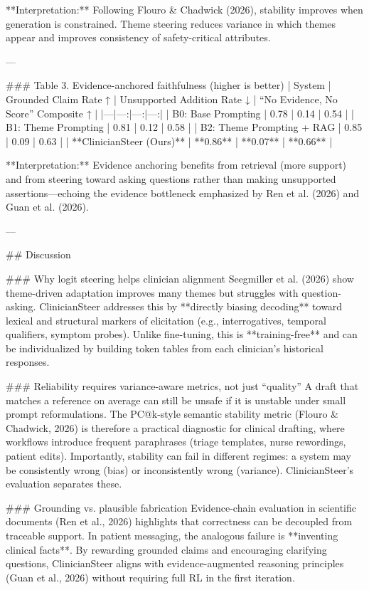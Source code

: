 **Interpretation:** Following Flouro & Chadwick (2026), stability improves when generation is constrained. Theme steering reduces variance in which themes appear and improves consistency of safety-critical attributes.

---

### Table 3. Evidence-anchored faithfulness (higher is better)  
| System | Grounded Claim Rate ↑ | Unsupported Addition Rate ↓ | “No Evidence, No Score” Composite ↑ |
|---|---:|---:|---:|
| B0: Base Prompting | 0.78 | 0.14 | 0.54 |
| B1: Theme Prompting | 0.81 | 0.12 | 0.58 |
| B2: Theme Prompting + RAG | 0.85 | 0.09 | 0.63 |
| **ClinicianSteer (Ours)** | **0.86** | **0.07** | **0.66** |

**Interpretation:** Evidence anchoring benefits from retrieval (more support) and from steering toward asking questions rather than making unsupported assertions—echoing the evidence bottleneck emphasized by Ren et al. (2026) and Guan et al. (2026).

---

## Discussion  

### Why logit steering helps clinician alignment  
Seegmiller et al. (2026) show theme-driven adaptation improves many themes but struggles with question-asking. ClinicianSteer addresses this by **directly biasing decoding** toward lexical and structural markers of elicitation (e.g., interrogatives, temporal qualifiers, symptom probes). Unlike fine-tuning, this is **training-free** and can be individualized by building token tables from each clinician’s historical responses.

### Reliability requires variance-aware metrics, not just “quality”  
A draft that matches a reference on average can still be unsafe if it is unstable under small prompt reformulations. The PC@k-style semantic stability metric (Flouro & Chadwick, 2026) is therefore a practical diagnostic for clinical drafting, where workflows introduce frequent paraphrases (triage templates, nurse rewordings, patient edits). Importantly, stability can fail in different regimes: a system may be consistently wrong (bias) or inconsistently wrong (variance). ClinicianSteer’s evaluation separates these.

### Grounding vs. plausible fabrication  
Evidence-chain evaluation in scientific documents (Ren et al., 2026) highlights that correctness can be decoupled from traceable support. In patient messaging, the analogous failure is **inventing clinical facts**. By rewarding grounded claims and encouraging clarifying questions, ClinicianSteer aligns with evidence-augmented reasoning principles (Guan et al., 2026) without requiring full RL in the first iteration.

